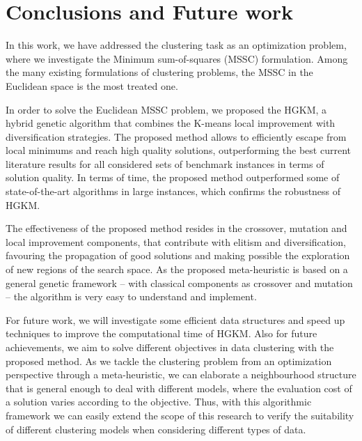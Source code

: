 \chapter{Conclusions and Future work}

In this work, we have addressed the clustering task as an optimization problem, where we investigate the Minimum sum-of-squares (MSSC) formulation. Among the many existing formulations of clustering problems, the MSSC in the Euclidean space is the most treated one.

In order to solve the Euclidean MSSC problem, we proposed the HGKM, a hybrid genetic algorithm that combines the K-means local improvement with diversification strategies. The proposed method allows to efficiently escape from local minimums and reach high quality solutions, outperforming the best current literature results for all considered sets of benchmark instances in terms of solution quality. In terms of time, the proposed method outperformed some of state-of-the-art algorithms in large instances, which confirms the robustness of HGKM.

The effectiveness of the proposed method resides in the crossover, mutation and local improvement components, that contribute with elitism and diversification, favouring the propagation of good solutions and making possible the exploration of new regions of the search space. As the proposed meta-heuristic is based on a general genetic framework -- with classical components as crossover and mutation -- the algorithm is very easy to understand and implement.

For future work, we will investigate some efficient data structures and speed up techniques to improve the computational time of HGKM. Also for future achievements, we aim to solve different objectives in data clustering with the proposed method. As we tackle the clustering problem from an optimization perspective through a meta-heuristic, we can elaborate a neighbourhood structure that is general enough to deal with different models, where the evaluation cost of a solution varies according to the objective. Thus, with this algorithmic framework we can easily extend the scope of this research to verify the suitability of different clustering models when considering different types of data.